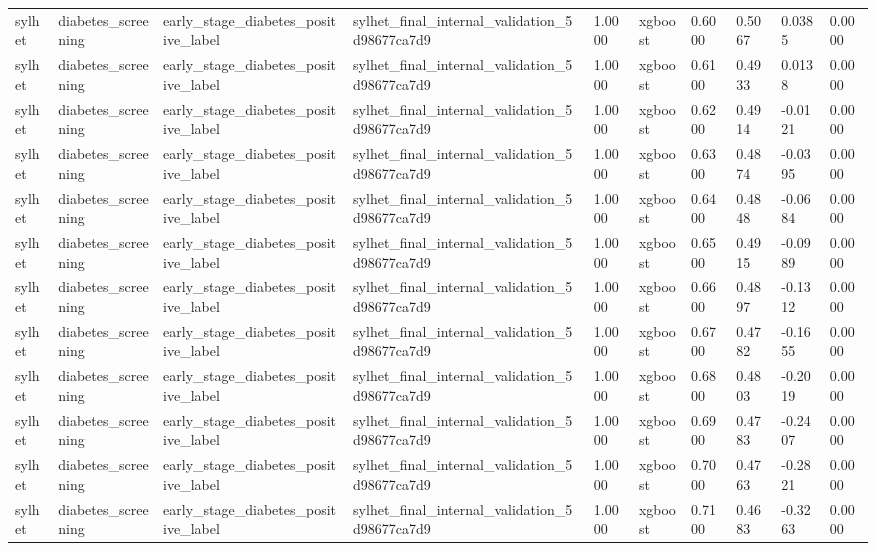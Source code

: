 \begin{tabular}{llllllllll}
sylhet & diabetes\_screening & early\_stage\_diabetes\_positive\_label & sylhet\_final\_internal\_validation\_5d98677ca7d9 & 1.0000 & xgboost & 0.6000 & 0.5067 & 0.0385 & 0.0000 \\
sylhet & diabetes\_screening & early\_stage\_diabetes\_positive\_label & sylhet\_final\_internal\_validation\_5d98677ca7d9 & 1.0000 & xgboost & 0.6100 & 0.4933 & 0.0138 & 0.0000 \\
sylhet & diabetes\_screening & early\_stage\_diabetes\_positive\_label & sylhet\_final\_internal\_validation\_5d98677ca7d9 & 1.0000 & xgboost & 0.6200 & 0.4914 & -0.0121 & 0.0000 \\
sylhet & diabetes\_screening & early\_stage\_diabetes\_positive\_label & sylhet\_final\_internal\_validation\_5d98677ca7d9 & 1.0000 & xgboost & 0.6300 & 0.4874 & -0.0395 & 0.0000 \\
sylhet & diabetes\_screening & early\_stage\_diabetes\_positive\_label & sylhet\_final\_internal\_validation\_5d98677ca7d9 & 1.0000 & xgboost & 0.6400 & 0.4848 & -0.0684 & 0.0000 \\
sylhet & diabetes\_screening & early\_stage\_diabetes\_positive\_label & sylhet\_final\_internal\_validation\_5d98677ca7d9 & 1.0000 & xgboost & 0.6500 & 0.4915 & -0.0989 & 0.0000 \\
sylhet & diabetes\_screening & early\_stage\_diabetes\_positive\_label & sylhet\_final\_internal\_validation\_5d98677ca7d9 & 1.0000 & xgboost & 0.6600 & 0.4897 & -0.1312 & 0.0000 \\
sylhet & diabetes\_screening & early\_stage\_diabetes\_positive\_label & sylhet\_final\_internal\_validation\_5d98677ca7d9 & 1.0000 & xgboost & 0.6700 & 0.4782 & -0.1655 & 0.0000 \\
sylhet & diabetes\_screening & early\_stage\_diabetes\_positive\_label & sylhet\_final\_internal\_validation\_5d98677ca7d9 & 1.0000 & xgboost & 0.6800 & 0.4803 & -0.2019 & 0.0000 \\
sylhet & diabetes\_screening & early\_stage\_diabetes\_positive\_label & sylhet\_final\_internal\_validation\_5d98677ca7d9 & 1.0000 & xgboost & 0.6900 & 0.4783 & -0.2407 & 0.0000 \\
sylhet & diabetes\_screening & early\_stage\_diabetes\_positive\_label & sylhet\_final\_internal\_validation\_5d98677ca7d9 & 1.0000 & xgboost & 0.7000 & 0.4763 & -0.2821 & 0.0000 \\
sylhet & diabetes\_screening & early\_stage\_diabetes\_positive\_label & sylhet\_final\_internal\_validation\_5d98677ca7d9 & 1.0000 & xgboost & 0.7100 & 0.4683 & -0.3263 & 0.0000 \\

\end{tabular}
